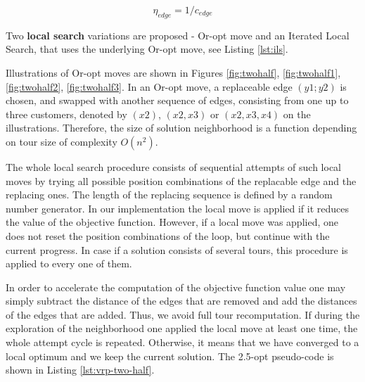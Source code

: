 \documentclass[12pt,a4paper,oneside]{book}
\begin{document}
\begin{equation}
\label{eq:vrp_heuristic_value}
\eta_{edge} = 1 / c_{edge}
\end{equation}

Two \textbf{local search} variations are proposed - Or-opt move \cite{Stattenberger2007} and an Iterated Local Search, that uses the underlying Or-opt move, see Listing \ref{lst:ils}.

Illustrations of Or-opt moves are shown in Figures \ref{fig:twohalf}, \ref{fig:twohalf1}, \ref{fig:twohalf2}, \ref{fig:twohalf3}. In an Or-opt move, a replaceable edge $(y1;y2)$ is chosen, and swapped with another sequence of edges, consisting from one up to three customers, denoted by $(x2)$, $(x2,x3)$ or $(x2,x3,x4)$ on the illustrations. Therefore, the size of solution neighborhood is a function depending on tour size of complexity $O(n^2)$.

The whole local search procedure consists of sequential attempts of such local moves by trying all possible position combinations of the replacable edge and the replacing ones. The length of the replacing sequence is defined by a random number generator. In our implementation the local move is applied if it reduces the value of the objective function. However, if a local move was applied, one does not reset the position combinations of the loop, but continue with the current progress. In case if a solution consists of several tours, this procedure is applied to every one of them.

In order to accelerate the computation of the objective function value one may simply subtract the distance of the edges that are removed and add the distances of the edges that are added. Thus, we avoid full tour recomputation. If during the exploration of the neighborhood one applied the local move at least one time, the whole attempt cycle is repeated. Otherwise, it means that we have converged to a local optimum and we keep the current solution. The 2.5-opt pseudo-code is shown in Listing \ref{lst:vrp-two-half}.
\end{document}
